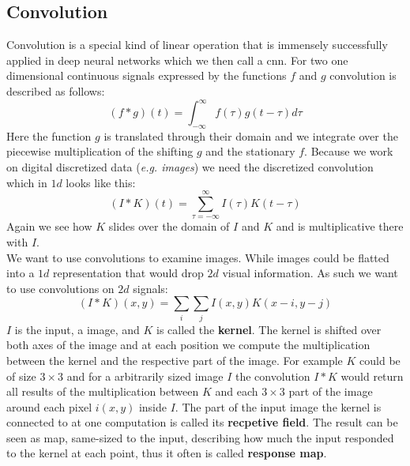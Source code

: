 \subsection{Convolution} %
\label{sub:conepts:nn:conv}
Convolution is a special kind of linear operation that is immensely successfully applied in deep neural networks which we then call a \acrfull{cnn}. For two one dimensional continuous signals expressed by the functions $f$ and $g$ convolution is described as follows:
\begin{equation}
    (f * g)(t) = \int_{-\infty}^\infty f(\tau)g(t - \tau)d\tau
\end{equation}
Here the function $g$ is translated through their domain and we integrate over the piecewise multiplication of the shifting $g$ and the stationary $f$.
Because we work on digital discretized data (\textit{e.g. images}) we need the discretized convolution which in $1d$ looks like this:
\begin{equation}
    (I * K)(t)  = \sum_{\tau = - \infty}^\infty I(\tau)K(t - \tau)
\end{equation}
Again we see how $K$ slides over the domain of $I$ and $K$ and is multiplicative there with $I$.\\
We want to use convolutions to examine images. While images could be flatted into a $1d$ representation that would drop $2d$ visual information. As such we want to use convolutions on $2d$ signals:
\begin{equation}
    (I * K)(x,y)  = \sum_i\sum_j I(x,y)K(x-i,y-j)
\end{equation}
$I$ is the input, a image, and $K$ is called the \textbf{kernel}. The kernel is shifted over both axes of the image and at each position we compute the multiplication between the kernel and the respective part of the image. For example $K$ could be of size $3\times 3$ and for a arbitrarily sized image $I$ the convolution $I * K$ would return all results of the multiplication between $K$ and each $3\times 3$ part of the image around each pixel $i(x,y)$ inside $I$. The part of the input image the kernel is connected to at one computation is called its \textbf{recpetive field}. The result can be seen as map, same-sized to the input, describing how much the input responded to the kernel at each point, thus it often is called \textbf{response map}.

